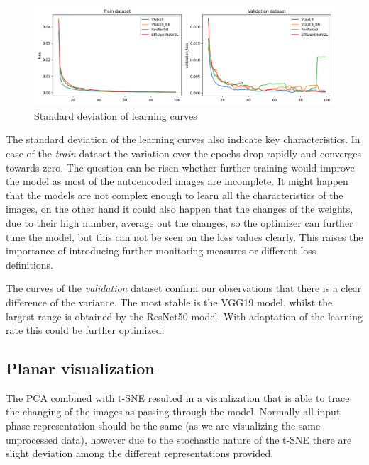 \begin{figure}[H]
    \centering
    \includegraphics[width=\textwidth]{./results/comparison/stdevs.png}
    \caption{Standard deviation of learning curves}
    \label{fig:learning_curve_stdevs}
\end{figure}

The standard deviation of the learning curves also indicate key characteristics.
In case of the \emph{train} dataset the variation over the epochs drop rapidly
and converges towards zero.
The question can be risen whether further training would improve the model
as most of the autoencoded images are incomplete.
It might happen that the models are not complex enough to learn all the characteristics
of the images, on the other hand it could also happen that the changes of the weights,
due to their high number, average out the changes, so the optimizer can further tune
the model, but this can not be seen on the loss values clearly.
This raises the importance of introducing further monitoring measures
or different loss definitions.

The curves of the \emph{validation} dataset confirm our observations that there is a clear
difference of the variance.
The most stable is the VGG19 model, whilst the largest range is obtained by the ResNet50 model.
With adaptation of the learning rate this could be further optimized.

\subsection{Planar visualization}
The PCA combined with t-SNE resulted in a visualization that is able to trace the changing of
the images as passing through the model.
Normally all input phase representation should be the same (as we are visualizing the same
unprocessed data), however due to the stochastic nature of the t-SNE there are slight deviation
among the different representations provided.

